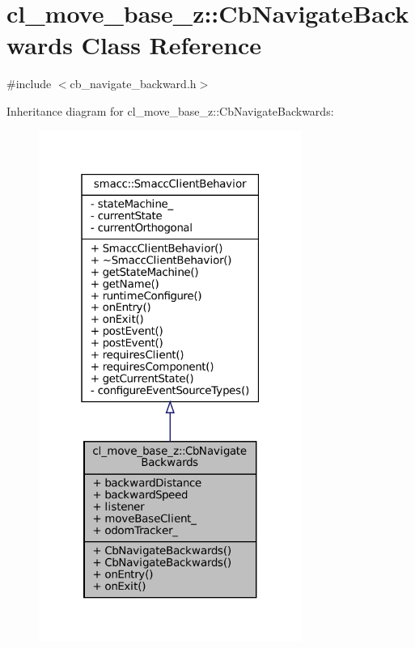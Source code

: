 \hypertarget{classcl__move__base__z_1_1CbNavigateBackwards}{}\section{cl\+\_\+move\+\_\+base\+\_\+z\+:\+:Cb\+Navigate\+Backwards Class Reference}
\label{classcl__move__base__z_1_1CbNavigateBackwards}


{\ttfamily \#include $<$cb\+\_\+navigate\+\_\+backward.\+h$>$}



Inheritance diagram for cl\+\_\+move\+\_\+base\+\_\+z\+:\+:Cb\+Navigate\+Backwards\+:
\nopagebreak
\begin{figure}[H]
\begin{center}
\leavevmode
\includegraphics[width=244pt]{classcl__move__base__z_1_1CbNavigateBackwards__inherit__graph}
\end{center}
\end{figure}


